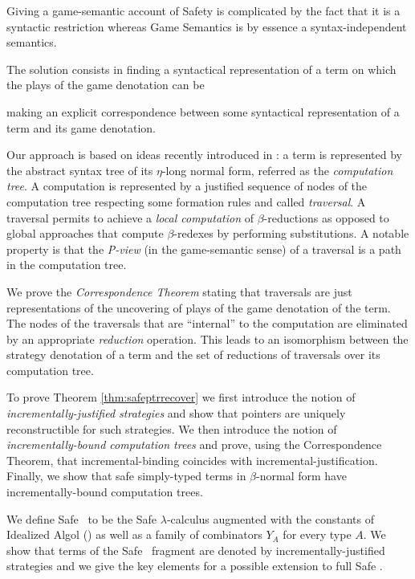 Giving a game-semantic account of Safety is complicated by the fact
that it is a syntactic restriction whereas Game Semantics is by
essence a syntax-independent semantics.

The solution consists in finding a syntactical representation of a
term on which the plays of the game denotation can be

making an explicit correspondence between some syntactical
representation of a term and its game denotation.

 Our approach is
based on ideas recently introduced in \cite{OngLics2006}: a term is
represented by the abstract syntax tree of its $\eta$-long normal
form, referred as the \emph{computation tree}. A computation is
represented by a justified sequence of nodes of the computation tree
respecting some formation rules and called \emph{traversal}. A
traversal permits to achieve a \emph{local computation} of
$\beta$-reductions as opposed to global approaches that compute
$\beta$-redexes by performing substitutions. A notable property is
that the \emph{P-view} (in the game-semantic sense) of a traversal
is a path in the computation tree.

We prove the \emph{Correspondence Theorem} stating that traversals
are just representations of the uncovering of plays of the game
denotation of the term. The nodes of the traversals that are
``internal'' to the computation are eliminated by an appropriate
\emph{reduction} operation. This leads to an isomorphism between the
strategy denotation of a term and the set of reductions of
traversals over its computation tree.

To prove Theorem \ref{thm:safeptrrecover} we first introduce the
notion of \emph{incrementally-justified strategies} and show that
pointers are uniquely reconstructible for such strategies. We then
introduce the notion of \emph{incrementally-bound computation trees}
and prove, using the Correspondence Theorem, that
incremental-binding coincides with incremental-justification.
Finally, we show that safe simply-typed terms in $\beta$-normal form
have incrementally-bound computation trees.

We define Safe \ialgol\ to be the Safe $\lambda$-calculus augmented
with the constants of Idealized Algol (\ialgol) as well as a family
of combinators $Y_A$ for every type $A$. We show that terms of the
Safe \pcf\ fragment are denoted by incrementally-justified
strategies and we give the key elements for a possible extension to
full Safe \ialgol.





